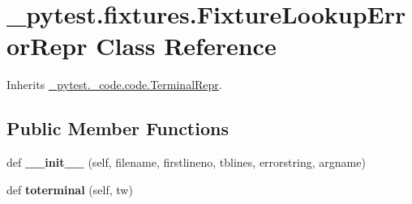 \hypertarget{class__pytest_1_1fixtures_1_1_fixture_lookup_error_repr}{}\section{\+\_\+pytest.\+fixtures.\+Fixture\+Lookup\+Error\+Repr Class Reference}
\label{class__pytest_1_1fixtures_1_1_fixture_lookup_error_repr}


Inherits \hyperlink{class__pytest_1_1__code_1_1code_1_1_terminal_repr}{\+\_\+pytest.\+\_\+code.\+code.\+Terminal\+Repr}.

\subsection*{Public Member Functions}
\begin{DoxyCompactItemize}
\item 
\mbox{\label{class__pytest_1_1fixtures_1_1_fixture_lookup_error_repr_a2adb8d9a7de6b2f0761200b2f951f88a}} 
def {\bfseries \+\_\+\+\_\+init\+\_\+\+\_\+} (self, filename, firstlineno, tblines, errorstring, argname)
\item 
\mbox{\label{class__pytest_1_1fixtures_1_1_fixture_lookup_error_repr_a778ce078730d5c4e2a192c1953329a24}} 
def {\bfseries toterminal} (self, tw)
\end{DoxyCompactItemize}
